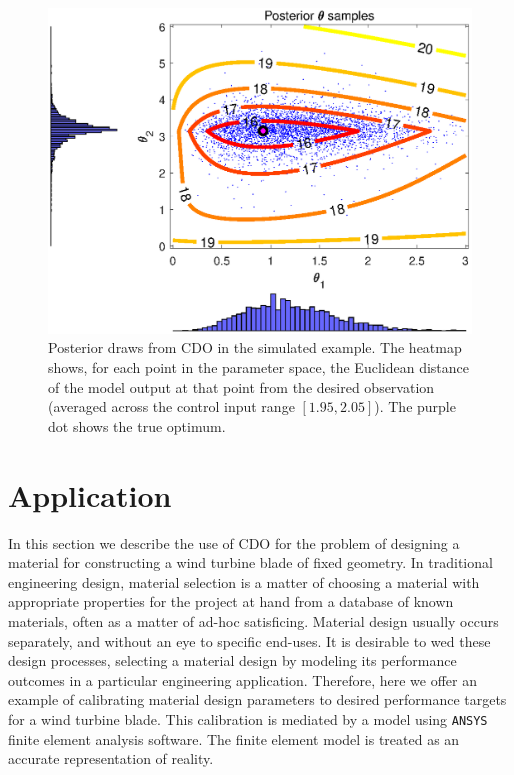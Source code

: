 \documentclass{article}
\begin{document}
\begin{figure}
\centering
\includegraphics[width=.65\linewidth]{FIG_post_theta_contour_desobs0_lambdadelta1}
\captionsetup{width=.65\linewidth}
\caption{Posterior draws from CDO in the simulated example. The heatmap shows, for each point in the parameter space, the Euclidean distance of the model output at that point from the desired observation (averaged across the control input range $[1.95,2.05]$). The purple dot shows the true optimum.}
\label{fig:toy_sim_results}
\end{figure}



\section{Application}\label{application}

In this section we describe the use of CDO for the problem of designing a material for constructing a wind turbine blade of fixed geometry. 
%
In traditional engineering design, material selection is a matter of choosing a material with appropriate properties for the project at hand from a database of known materials, often as a matter of ad-hoc satisficing. 
%
Material design usually occurs separately, and without an eye to specific end-uses. 
%
It is desirable to wed these design processes, selecting a material design by modeling its performance outcomes in a particular engineering application. 
%
Therefore, here we offer an example of calibrating material design parameters to desired performance targets for a wind turbine blade. 
%
This calibration is mediated by a model using \texttt{ANSYS} finite element analysis software. 
%
The finite element model is treated as an accurate representation of reality. %
\end{document}
